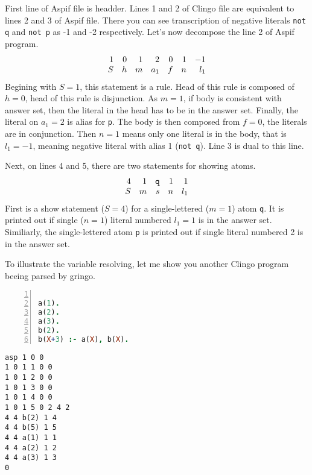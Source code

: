 \documentclass[
    digital,
    color,
    oneside,
    sansbold,
    lot,
    nolof
]{fithesis}
\begin{document}
First line of Aspif file is headder. Lines 1 and 2 of Clingo file are
equivalent to lines 2 and 3 of Aspif file. There you can see transcription
of negative literals \texttt{not q} and \texttt{not p} as -1 and -2
respectively. Let's now decompose the line 2 of Aspif program.
\begin{equation*}
    \begin{array}{r rrr rrr}
        1 & 0 & 1 & 2 & 0 & 1 & -1\\
        S & h & m & a_1 & f & n & l_1\\
    \end{array}
\end{equation*}
Begining with $S=1$, this statement is a rule. Head of this rule is composed
of $h=0$, head of this rule is disjunction. As $m=1$, if body is consistent
with answer set, then the literal in the head has to be in the answer set.
Finally, the literal on $a_1=2$ is alias for \texttt{p}.
The body is then composed from $f=0$, the literals are in conjunction.
Then $n=1$ means only one literal is in the body, that is $l_1=-1$, meaning
negative literal with alias 1 (\texttt{not q}). Line 3 is dual to this line.

Next, on lines 4 and 5, there are two statements for showing atoms.
\begin{equation*}
    \begin{array}{r rr rr}
        4 & 1 & \texttt{q} & 1 & 1\\
        S & m & s & n & l_1\\
    \end{array}
\end{equation*}
First is a show statement ($S=4$) for a single-lettered ($m=1$)
atom \texttt{q}. It is printed out if single ($n=1$) literal
numbered $l_1=1$ is in the answer set. Similiarly, the single-lettered atom
\texttt{p} is printed out if single literal numbered 2 is in the answer set.

To illustrate the variable resolving, let me show you another Clingo program
beeing parsed by gringo.

\begin{minipage}[t]{0.45\linewidth}
\centering
\begin{lstlisting}[language=prolog, numbers=left, countblanklines=false]

a(1).
a(2).
a(3).
b(2).
b(X+3) :- a(X), b(X).
\end{lstlisting}
\end{minipage}
\hspace{1em}
\begin{minipage}[t]{0.45\linewidth}
\centering
\begin{lstlisting}[numbers=right, countblanklines=false]
asp 1 0 0
1 0 1 1 0 0
1 0 1 2 0 0
1 0 1 3 0 0
1 0 1 4 0 0
1 0 1 5 0 2 4 2
4 4 b(2) 1 4
4 4 b(5) 1 5
4 4 a(1) 1 1
4 4 a(2) 1 2
4 4 a(3) 1 3
0
\end{lstlisting}
\end{minipage}
\end{document}
